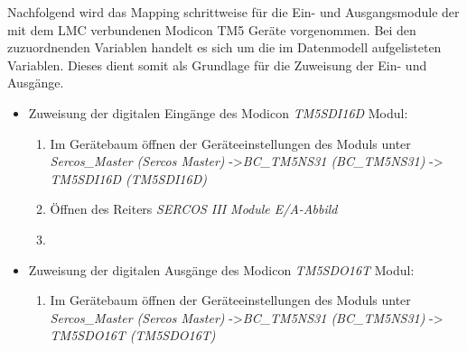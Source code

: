 \documentclass[../../../Bachelorarbeit.tex]{subfiles}
\begin{document}

Nachfolgend wird das Mapping schrittweise für die Ein- und Ausgangsmodule der mit dem LMC verbundenen Modicon TM5 Geräte vorgenommen. Bei den zuzuordnenden Variablen handelt es sich um die im Datenmodell aufgelisteten Variablen. Dieses dient somit als Grundlage für die Zuweisung der Ein- und Ausgänge.

\begin{itemize}
    \item Zuweisung der digitalen Eingänge des Modicon \textit{TM5SDI16D} Modul:
    \begin{enumerate}
        \item Im Gerätebaum öffnen der Geräteeinstellungen des Moduls unter \textit{Sercos\_Master (Sercos Master)} ->\small \textit{BC\_TM5NS31 (BC\_TM5NS31)} -> \textit{TM5SDI16D (TM5SDI16D)}
        \item \normalsize Öffnen des Reiters \textit{SERCOS III Module E/A-Abbild}
        \item \begin{minipage}[t]{\linewidth}
            \raggedright
            \label{fig:my-img26}
        \end{minipage}
    \end{enumerate}
    \item Zuweisung der digitalen Ausgänge des Modicon \textit{TM5SDO16T} Modul:
    \begin{enumerate}
        \item Im Gerätebaum öffnen der Geräteeinstellungen des Moduls unter \textit{Sercos\_Master (Sercos Master)} ->\small \textit{BC\_TM5NS31 (BC\_TM5NS31)} -> \textit{TM5SDO16T (TM5SDO16T)}

\end{enumerate}
\end{itemize}
\end{document}
